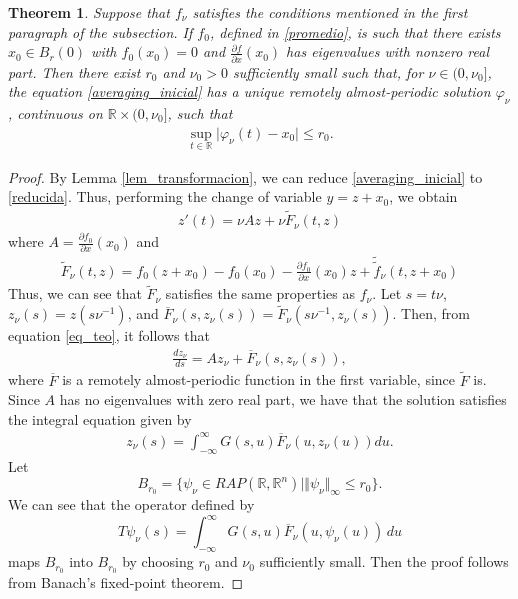 \documentclass[english,reqno]{amsart}
\numberwithin{equation}{section}
\theoremstyle{plain}
\newtheorem{thm}{Theorem}[section]
\theoremstyle{definition}
\theoremstyle{remark}
\newcommand{\bb}[1]{{\mathbb{#1}}}
\begin{document}
\begin{thm}\label{teo_averaging}
Suppose that $f_\nu$ satisfies the conditions mentioned in the first paragraph of the subsection.  
If $f_0$, defined in \eqref{promedio}, is such that there exists $x_0 \in B_{r}(0)$ with $f_0(x_0)=0$ and $\frac{\partial f}{\partial x}(x_0)$ has eigenvalues with nonzero real part.  
Then there exist $r_0$ and $\nu_0>0$ sufficiently small such that, for $\nu\in(0,\nu_0]$, the equation \eqref{averaging_inicial} has a unique remotely almost-periodic solution $\varphi_\nu$, continuous on $\mathbb{R}\times(0,\nu_0]$, such that
\begin{eqnarray}
\sup_{t\in \mathbb{R}}\vert \varphi_\nu(t) -x_0 \vert \leq r_0. \label{acotacion}
\end{eqnarray}
\end{thm}
\begin{proof}
By Lemma \ref{lem_transformacion}, we can reduce \eqref{averaging_inicial} to \eqref{reducida}.  
Thus, performing the change of variable $y = z + x_0$, we obtain
\begin{eqnarray}
z'(t)=\nu A z+\nu \tilde{F}_{\nu}(t,z)\label{eq_teo}
\end{eqnarray}
where $A=\frac{\partial f_0}{\partial x}(x_0)$ and 
\begin{eqnarray*}
\tilde{F}_{\nu}(t,z)=f_0(z+x_0)-f_0(x_0)-\frac{\partial f_0}{\partial x}(x_0)z+\tilde{\tilde{f}}_{\nu}(t,z+x_0)
\end{eqnarray*}
Thus, we can see that $\tilde{F}_{\nu}$ satisfies the same properties as $f_\nu$.  
Let $s = t\nu$, $z_{\nu}(s) = z(s\nu^{-1})$, and $\overline{F}_{\nu}(s,z_{\nu}(s)) = \tilde{F}_{\nu}(s\nu^{-1},z_{\nu}(s))$.  
Then, from equation \eqref{eq_teo}, it follows that
\begin{eqnarray*}
\frac{d z_{\nu}}{ds}=A z_{\nu}+\overline{F}_{\nu}(s,z_{\nu}(s)),
\end{eqnarray*}
where $\overline{F}$ is a remotely almost-periodic function in the first variable, since $\tilde{F}$ is.  
Since $A$ has no eigenvalues with zero real part, we have that the solution satisfies the integral equation given by 
\begin{eqnarray*}
z_{\nu}(s)=\int_{-\infty}^{\infty} G(s,u)\overline{F}_{\nu}(u,z_{\nu}(u))du.
\end{eqnarray*}
Let $$B_{r_{0}}=\{\psi_{\nu}\in RAP(\bb{R},\bb{R}^{n}) \vert \Vert \psi_{\nu} \Vert_{\infty} \leq r_{0} \}.$$
We can see that the operator defined by  
\[
T\psi_{\nu}(s)=\int_{-\infty}^{\infty} G(s,u)\overline{F}_{\nu}(u,\psi_{\nu}(u))\,du
\]  
maps $B_{r_{0}}$ into $B_{r_{0}}$ by choosing $r_0$ and $\nu_0$ sufficiently small.  
Then the proof follows from Banach's fixed-point theorem.
\end{proof}
\end{document}
